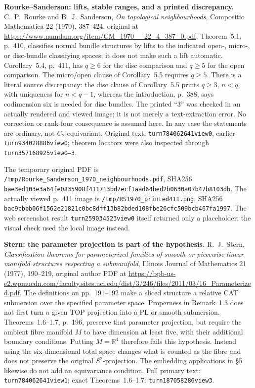 \textbf{Rourke--Sanderson: lifts, stable ranges, and a printed discrepancy.}\quad
C.~P.~Rourke and B.~J.~Sanderson, \emph{On topological neighbourhoods},
Compositio Mathematica 22 (1970), 387--424, original at
\url{https://www.numdam.org/item/CM_1970__22_4_387_0.pdf}.
Theorem~5.1, p.~410, classifies normal bundle structures by lifts to
the indicated open-, micro-, or disc-bundle classifying spaces; it
does not make such a lift automatic.  Corollary~5.4, p.~411, has
\(q\ge6\) for the disc comparison and \(q\ge5\) for the open comparison.
The micro/open clause of Corollary~5.5 requires \(q\ge5\).
There is a literal source discrepancy: the disc clause of Corollary~5.5
prints \(q\ge3\), \(n<q\), with uniqueness for \(n<q-1\), whereas the
introduction, p.~388, says codimension six is needed for disc bundles.
The printed ``3'' was checked in an actually rendered and viewed image;
it is not merely a text-extraction error.  No correction or rank-four
consequence is assumed here.  In any case the statements are ordinary,
not \(C_2\)-equivariant.
Original text: \texttt{turn784062641view0}, earlier
\texttt{turn934028886view0}; theorem locators were also inspected through
\texttt{turn357168925view0--3}.

The temporary original PDF is
\texttt{/tmp/Rourke\_Sanderson\_1970\_neighbourhoods.pdf}, SHA256
\texttt{bae3ed103e3a64fe0835908f411713bd7ecf1aad64bed2b0630a07b47b8103db}.
The actually viewed p.~411 image is
\texttt{/tmp/RS1970\_printed411.png}, SHA256
\texttt{bac9cbbb06f1562e21821c0bc8dff13b82bded108fbe26cfc509bcb467fa1997}.
The web screenshot result \texttt{turn259034523view0} itself returned
only a placeholder; the visual check used the local image instead.

\textbf{Stern: the parameter projection is part of the hypothesis.}\quad
R.~J.~Stern, \emph{Classification theorems for parameterized families
of smooth or piecewise linear manifold structures respecting a
submanifold}, Illinois Journal of Mathematics 21 (1977), 190--219,
original author PDF at
\url{https://bpb-us-e2.wpmucdn.com/faculty.sites.uci.edu/dist/3/246/files/2011/03/16_Parameterized.pdf}.
The definitions on pp.~191--192 make a sliced structure a relative CAT
submersion over the specified parameter space.  Properness in
Remark~1.3 does not first turn a given TOP projection into a PL or smooth
submersion.  Theorems~1.6--1.7, p.~196, preserve that parameter
projection, but require the ambient fibre manifold \(M\) to have
dimension at least five, with their additional boundary conditions.
Putting \(M=\mathbb R^4\) therefore fails this hypothesis.  Instead
using the six-dimensional total space changes what is counted as the
fibre and does not preserve the original \(S^2\)-projection.
The embedding applications in \S5 likewise do not add an equivariance
condition.  Full primary text: \texttt{turn784062641view1}; exact
Theorems~1.6--1.7: \texttt{turn187058286view3}.

